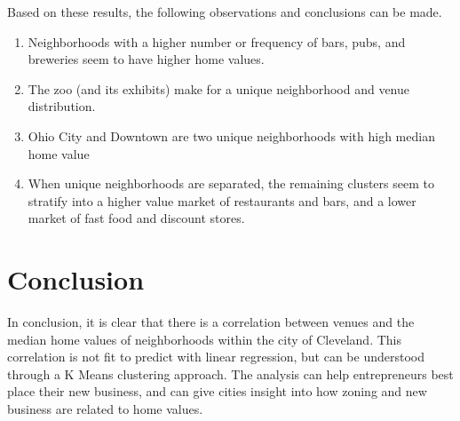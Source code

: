 \documentclass[twoside,14pt]{report}
\begin{document}
Based on these results, the following observations and conclusions can be made.

\begin{enumerate}
    \item Neighborhoods with a higher number or frequency of bars, pubs, and breweries seem to have higher home values.
    \item The zoo (and its exhibits) make for a unique neighborhood and venue distribution.
    \item Ohio City and Downtown are two unique neighborhoods with high median home value
    \item When unique neighborhoods are separated, the remaining clusters seem to stratify into a higher value market of restaurants and bars, and a lower market of fast food and discount stores. 
\end{enumerate}

\chapter*{Conclusion}
In conclusion, it is clear that there is a correlation between venues and the median home values of neighborhoods within the city of Cleveland.  This correlation is not fit to predict with linear regression, but can be understood through a K Means clustering approach.  The analysis can help entrepreneurs best place their new business, and can give cities insight into how zoning and new business are related to home values. 
\end{document}
